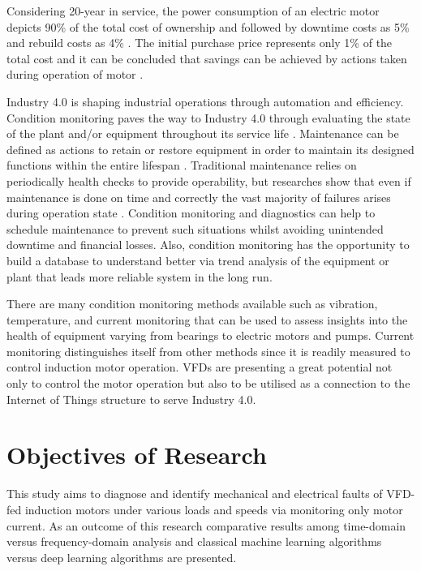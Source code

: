 Considering 20-year in service, the power consumption of an electric motor depicts 90\% of the total cost of ownership and followed by downtime costs as 5\% and rebuild costs as 4\% \cite{waide2011energy}. The initial purchase price represents only 1\% of the total cost and it can be concluded that savings can be achieved by actions taken during operation of motor \cite{waide2011energy}.

Industry 4.0 is shaping industrial operations through automation and efficiency. Condition monitoring paves the way to Industry 4.0 through evaluating the state of the plant and/or equipment throughout its service life \cite{en201713306}. Maintenance can be defined as actions to retain or restore equipment in order to maintain its designed functions within the entire lifespan \cite{en201713306}. Traditional maintenance relies on periodically health checks to provide operability, but researches show that even if maintenance is done on time and correctly the vast majority of failures arises during operation state \cite{motor1985report}. Condition monitoring and diagnostics can help to schedule maintenance to prevent such situations whilst avoiding unintended downtime and financial losses. Also, condition monitoring has the opportunity to build a database to understand better via trend analysis of the equipment or plant that leads more reliable system in the long run. 

There are many condition monitoring methods available such as vibration, temperature, and current monitoring that can be used to assess insights into the health of equipment varying from bearings to electric motors and pumps. Current monitoring distinguishes itself from other methods since it is readily measured to control induction motor operation. VFDs are presenting a great potential not only to control the motor operation but also to be utilised as a connection to the Internet of Things structure to serve Industry 4.0.

\section{Objectives of Research}
\label{objectives}

This study aims to diagnose and identify mechanical and electrical faults of VFD-fed induction motors under various loads and speeds via monitoring only motor current. As an outcome of this research comparative results among time-domain versus frequency-domain analysis and classical machine learning algorithms versus deep learning algorithms are presented.


